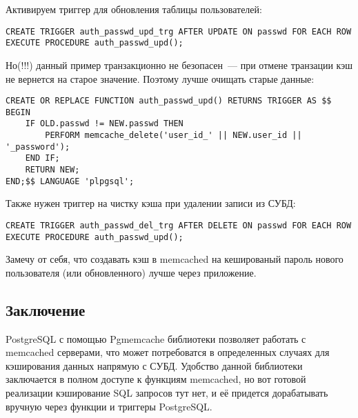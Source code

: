 Активируем триггер для обновления таблицы пользователей:
\begin{lstlisting}[label=lst:pgcache11,caption=Триггер]
CREATE TRIGGER auth_passwd_upd_trg AFTER UPDATE ON passwd FOR EACH ROW EXECUTE PROCEDURE auth_passwd_upd();
\end{lstlisting}

Но(!!!) данный пример транзакционно не безопасен~--- при отмене транзации кэш не вернется на старое значение. 
Поэтому лучше очищать старые данные:
\begin{lstlisting}[label=lst:pgcache12,caption=Очистка ключа в кэше]
CREATE OR REPLACE FUNCTION auth_passwd_upd() RETURNS TRIGGER AS $$
BEGIN
	IF OLD.passwd != NEW.passwd THEN
		PERFORM memcache_delete('user_id_' || NEW.user_id || '_password');
	END IF;
	RETURN NEW;
END;$$ LANGUAGE 'plpgsql';
\end{lstlisting}
 
Также нужен триггер на чистку кэша при удалении записи из СУБД:
\begin{lstlisting}[label=lst:pgcache11,caption=Триггер]
CREATE TRIGGER auth_passwd_del_trg AFTER DELETE ON passwd FOR EACH ROW EXECUTE PROCEDURE auth_passwd_upd();
\end{lstlisting}

Замечу от себя, что создавать кэш в memcached на кешированый пароль нового пользователя (или обновленного) лучше через приложение.

\subsection{Заключение}
PostgreSQL с помощью Pgmemcache библиотеки позволяет работать с memcached серверами, 
что может потребоватся в определенных случаях для кэширования данных напрямую с СУБД. 
Удобство данной библиотеки заключается в полном доступе к функциям memcached, 
но вот готовой реализации кэширование SQL запросов тут нет, 
и её придется дорабатывать вручную через функции и триггеры PostgreSQL.
